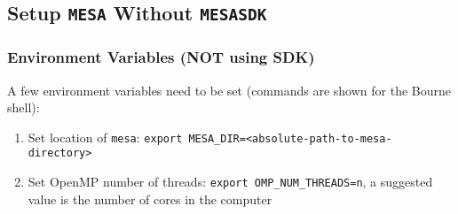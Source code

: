 \subsection{Setup {\tt MESA} Without {\tt MESASDK}}
\label{sec:woSDK}

\subsubsection{Environment Variables (NOT using SDK)}
A few environment variables need to be set (commands are shown for the 
Bourne shell):
\begin{enumerate}
\item Set location of {\tt mesa}: 
{\tt export MESA\_DIR=<absolute-path-to-mesa-directory>}

\item Set OpenMP number of threads: {\tt export OMP\_NUM\_THREADS=n}, a suggested value is the number of cores in the computer
\end{enumerate}

